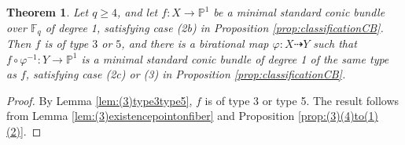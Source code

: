 \documentclass[a4paper, 11pt, reqno]{amsart}
\numberwithin{equation}{section} \numberwithin{figure}{section}
\def \F {{\mathbb F}}
\def \P {{\mathbb P}}
\newcommand{\ra}{\rightarrow}
\newtheorem{theorem}[lemma]{Theorem}
\theoremstyle{definition}
\numberwithin{lemma}{section}
\begin{document}
\begin{theorem}\label{thm:(2b)to(2c,3)}
    Let $q \geq 4$, and let $f \colon X \ra \P^1$ be a minimal standard conic bundle over $\F_q$ of degree 1, satisfying case (2b) in Proposition \ref{prop:classificationCB}. Then $f$ is of type $3$ or $5$, and there is a birational map $\varphi \colon X \dashrightarrow Y$ such that $f \circ \varphi^{-1} \colon Y \ra \P^1$ is a minimal standard conic bundle of degree 1 of the same type as $f$, satisfying case (2c) or (3) in Proposition \ref{prop:classificationCB}.
\end{theorem}

\begin{proof}
    By Lemma \ref{lem:(3)type3type5}, $f$ is of type 3 or type 5. The result follows from Lemma \ref{lem:(3)existencepointonfiber} and Proposition \ref{prop:(3)(4)to(1)(2)}.
\end{proof}
\end{document}
